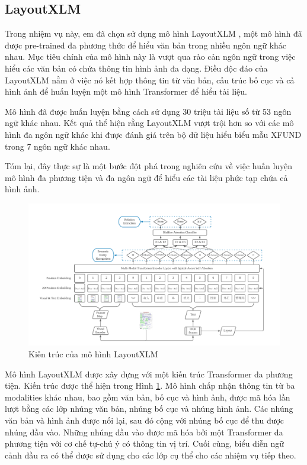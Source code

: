 \subsection{LayoutXLM}
Trong nhiệm vụ này, em đã chọn sử dụng mô hình LayoutXLM \cite{xu2021layoutxlm}, một mô hình đã được pre-trained đa phương thức để hiểu văn bản trong nhiều ngôn ngữ khác nhau. Mục tiêu chính của mô hình này là vượt qua rào cản ngôn ngữ trong việc hiểu các văn bản có chứa thông tin hình ảnh đa dạng. Điều độc đáo của LayoutXLM nằm ở việc nó kết hợp thông tin từ văn bản, cấu trúc bố cục và cả hình ảnh để huấn luyện một mô hình Transformer để hiểu tài liệu.

Mô hình đã được huấn luyện bằng cách sử dụng 30 triệu tài liệu số từ 53 ngôn ngữ khác nhau. Kết quả thể hiện rằng LayoutXLM vượt trội hơn so với các mô hình đa ngôn ngữ khác khi được đánh giá trên bộ dữ liệu hiểu biểu mẫu XFUND trong 7 ngôn ngữ khác nhau.

Tóm lại, đây thực sự là một bước đột phá trong nghiên cứu về việc huấn luyện mô hình đa phương tiện và đa ngôn ngữ để hiểu các tài liệu phức tạp chứa cả hình ảnh.

\begin{figure}[h]
    \includegraphics[scale=0.4]{images/layoutxml-architecture.png}
    \caption{Kiến trúc của mô hình LayoutXLM}
    \label{layoutxml}
\end{figure}

Mô hình LayoutXLM được xây dựng với một kiến trúc Transformer đa phương tiện. Kiến trúc được thể hiện trong Hình \ref{layoutxml}. Mô hình chấp nhận thông tin từ ba modalities khác nhau, bao gồm văn bản, bố cục và hình ảnh, được mã hóa lần lượt bằng các lớp nhúng văn bản, nhúng bố cục và nhúng hình ảnh. Các nhúng văn bản và hình ảnh được nối lại, sau đó cộng với nhúng bố cục để thu được nhúng đầu vào. Những nhúng đầu vào được mã hóa bởi một Transformer đa phương tiện với cơ chế tự-chú ý có thông tin vị trí. Cuối cùng, biểu diễn ngữ cảnh đầu ra có thể được sử dụng cho các lớp cụ thể cho các nhiệm vụ tiếp theo. 

